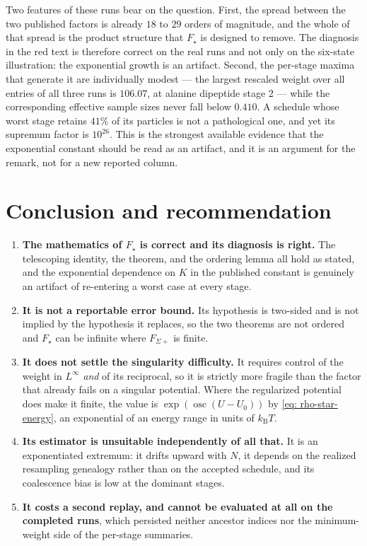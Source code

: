 \documentclass[11pt]{article}
\theoremstyle{plain}
\newcommand{\osc}{\operatorname{osc}}
\begin{document}
Two features of these runs bear on the question. First, the spread between the
two published factors is already $18$ to $29$ orders of magnitude, and the
whole of that spread is the product structure that $F_\star$ is designed to
remove. The diagnosis in the red text is therefore correct on the real runs and
not only on the six-state illustration: the exponential growth is an artifact.
Second, the per-stage maxima that generate it are individually modest --- the
largest rescaled weight over all entries of all three runs is $106.07$, at
alanine dipeptide stage 2 --- while the corresponding effective sample sizes
never fall below $0.410$. A schedule whose worst stage retains $41\%$ of its
particles is not a pathological one, and yet its supremum factor is $10^{26}$.
This is the strongest available evidence that the exponential constant should
be read as an artifact, and it is an argument for the remark, not for a new
reported column.

\section{Conclusion and recommendation}

\begin{enumerate}
    \item \textbf{The mathematics of $F_\star$ is correct and its diagnosis is
    right.} The telescoping identity, the theorem, and the ordering lemma all
    hold as stated, and the exponential dependence on $K$ in the published
    constant is genuinely an artifact of re-entering a worst case at every
    stage.
    \item \textbf{It is not a reportable error bound.} Its hypothesis is
    two-sided and is not implied by the hypothesis it replaces, so the two
    theorems are not ordered and $F_\star$ can be infinite where $F_{\Sigma+}$
    is finite.
    \item \textbf{It does not settle the singularity difficulty.} It requires
    control of the weight in $L^\infty$ \emph{and} of its reciprocal, so it is
    strictly more fragile than the factor that already fails on a singular
    potential. Where the regularized potential does make it finite, the value
    is $\exp(\osc(U-U_0))$ by \eqref{eq: rho-star-energy}, an exponential of an
    energy range in units of $k_{\mathrm B}T$.
    \item \textbf{Its estimator is unsuitable independently of all that.} It is
    an exponentiated extremum: it drifts upward with $N$, it depends on the
    realized resampling genealogy rather than on the accepted schedule, and its
    coalescence bias is low at the dominant stages.
    \item \textbf{It costs a second replay, and cannot be evaluated at all on
    the completed runs}, which persisted neither ancestor indices nor the
    minimum-weight side of the per-stage summaries.
\end{enumerate}
\end{document}
